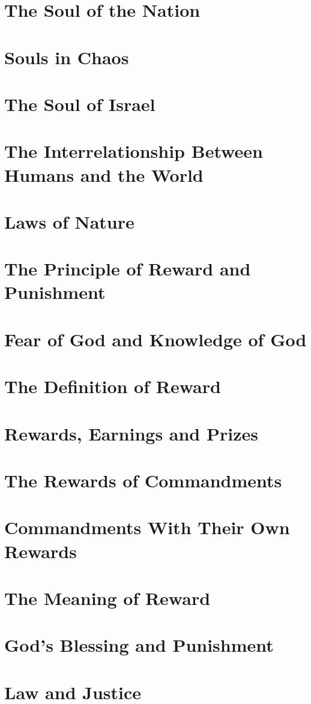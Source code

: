 \documentclass[11pt, a5paper, twoside, chapterprefix, openany]{scrbook}
\begin{document}
\chapter{The Soul of the Nation}
\chapter{Souls in Chaos}
\chapter{The Soul of Israel}
\chapter{The Interrelationship Between Humans and the World}
\chapter{Laws of Nature}
\chapter{The Principle of Reward and Punishment }
\chapter{Fear of God and Knowledge of God}
\chapter{The Definition of Reward}
\chapter{Rewards, Earnings and Prizes}
\chapter{The Rewards of Commandments}
\chapter{Commandments With Their Own Rewards}
\chapter{The Meaning of Reward}
\chapter{God’s Blessing and Punishment}
\chapter{Law and Justice}
\end{document}
